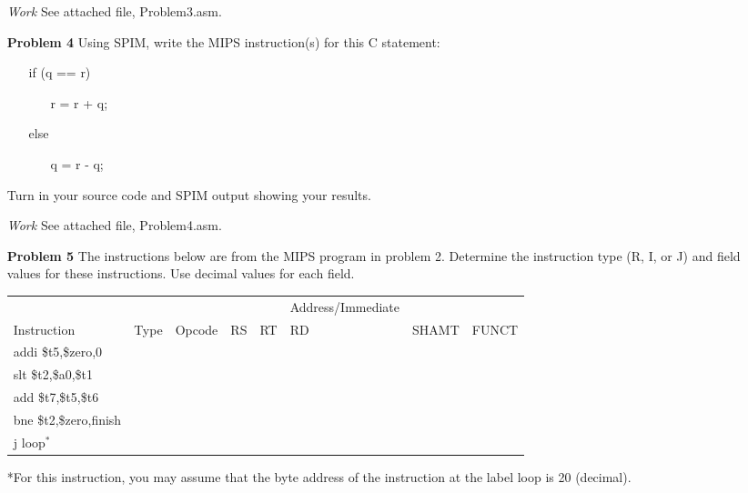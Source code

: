\documentclass[12pt]{article}
\begin{document}
\begin{enumerate}
  \item[\textit{Work}] See attached file, Problem3.asm.
\end{enumerate}




\begin{enumerate}
  \item[\textbf{Problem 4}] Using SPIM, write the MIPS instruction(s) for this C statement:
  \begin{enumerate}\ttfamily
    \item[] if  (q == r)
    \begin{enumerate}
      \item[] r = r + q;
    \end{enumerate}
    \item[] else
    \begin{enumerate}
      \item[] q = r - q;
    \end{enumerate}
  \end{enumerate}
	\item[]Turn in your source code and SPIM output showing your results.
\end{enumerate}

\begin{enumerate}
  \item[\textit{Work}] See attached file, Problem4.asm.
\end{enumerate}



\begin{enumerate}
  \item[\textbf{Problem 5}] The instructions below are from the MIPS program in problem 2.  Determine the instruction type (R, I, or J) and field values for these instructions.  Use decimal values for each field.

  \begin{tabular}{>{\ttfamily}p{6em}>{\ttfamily}p{2em}>{\ttfamily}p{3em}>{\ttfamily}p{2em}>{\ttfamily}p{2em}>{\ttfamily}p{2em}>{\ttfamily}p{3em}>{\ttfamily}p{3em}}
    & & & & & Address/Immediate & & \\
    Instruction & Type & Opcode & RS & RT & RD & SHAMT & FUNCT \\
    \scriptsize addi \$t5,\$zero,0 & & & & & & & \\
    \scriptsize slt \$t2,\$a0,\$t1 & & & & & & & \\
    \scriptsize add \$t7,\$t5,\$t6 & & & & & & & \\
    \scriptsize bne \$t2,\$zero,finish & & & & & & & \\
    \scriptsize j loop$^*$ & & & & & & &
  \end{tabular}

  *For this instruction, you may assume that the byte address of the instruction at the label loop is 20 (decimal).
\end{enumerate}
\end{document}
